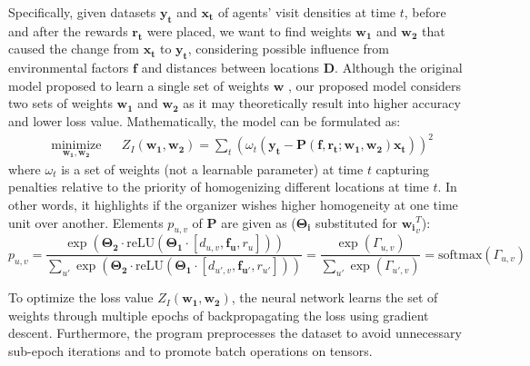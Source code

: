 \documentclass[12pt]{article}
\newcommand{\vect}[1]{\mathbf{#1}}  %
\newcommand{\matr}[1]{\mathbf{#1}}  %
\begin{document}
    Specifically, given datasets $\vect{y_t}$ and $\vect{x_t}$ of agents' visit densities at time $t$, before and after the rewards $\vect{r_t}$ were placed, we want to find weights $\matr{w_1}$ and $\matr{w_2}$ that caused the change from $\vect{x_t}$ to $\vect{y_t}$, considering possible influence from environmental factors $\matr{f}$ and distances between locations $\matr{D}$. Although the original model proposed to learn a single set of weights $\matr{w}$ \cite{Xue2016Avi2}, our proposed model considers two sets of weights $\matr{w_1}$ and $\matr{w_2}$ as it may theoretically result into higher accuracy and lower loss value. Mathematically, the model can be formulated as:
    \begin{equation} \label{eqn:iden_problem}
        \begin{aligned}
            & \underset{\matr{w_1}, \matr{w_2}}{\text{minimize}}
            & & Z_I(\matr{w_1}, \matr{w_2}) = \sum_{t} (\omega_t(\vect{y_t} - \matr{P}(\matr{f}, \vect{r_t}; \matr{w_1}, \matr{w_2})\vect{x_t}))^{2}
        \end{aligned}
    \end{equation}
    where $\omega_t$ is a set of weights (not a learnable parameter) at time $t$ capturing penalties relative to the priority of homogenizing different locations at time $t$. In other words, it highlights if the organizer wishes higher homogeneity at one time unit over another. Elements $p_{u, v}$ of $\matr{P}$ are given as ($\vect{\Theta_i}$ substituted for $\vect{w_i}_v^T$):
    \begin{equation} \label{eqn:puv_equation}
    p_{u, v} = \frac{\exp(\vect{\Theta_2} \cdot \text{reLU} (\matr{\Theta_1} \cdot [d_{u, v}, \vect{f_{u}}, r_{u}]))}{\sum_{u'} \exp(\vect{\Theta_2} \cdot \text{reLU} (\matr{\Theta_1} \cdot [d_{u', v}, \vect{f_{u'}}, r_{u'}]))} = \frac{\exp(\Gamma_{u, v})}{\sum_{u'}\exp(\Gamma_{u', v})} = \text{softmax}(\Gamma_{u, v})
    \end{equation}
    
    To optimize the loss value $Z_I(\matr{w_1}, \matr{w_2})$, the neural network learns the set of weights through multiple epochs of backpropagating the loss using gradient descent. Furthermore, the program preprocesses the dataset to avoid unnecessary sub-epoch iterations and to promote batch operations on tensors.
    
\end{document}
